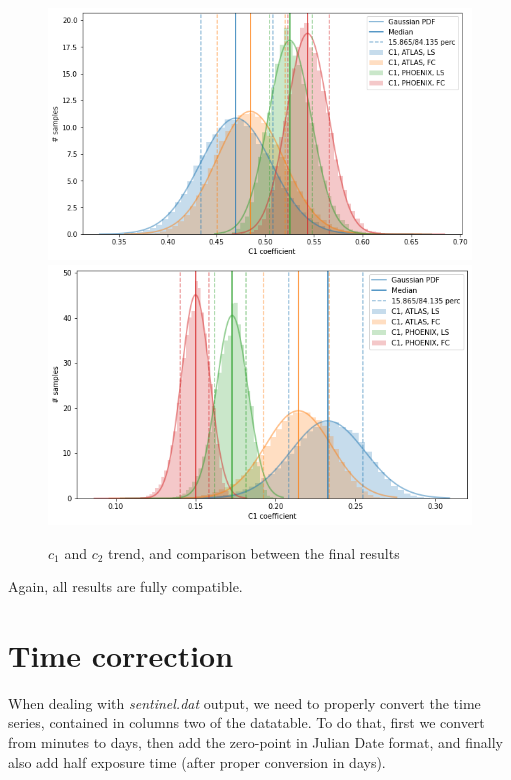 \documentclass[a4paper,11pt,twocolumn]{article}
\begin{document}
\begin{figure}[H]
    \includegraphics[scale=0.35, angle=0]{../pictures/Claret2011/c1_comp.png}
    \includegraphics[scale=0.35, angle=0]{../pictures/Claret2011/c2_comp.png}
    \caption{$c_1$ and $c_2$ trend, and comparison between the final results}
\end{figure}
Again, all results are fully compatible.

\section{Time correction}
\label{sect:app_B}

When dealing with \textit{sentinel.dat} output, we need to properly convert the 
time series, contained in columns two of the datatable. To do that, first we
convert from minutes to days, then add the zero-point in Julian Date format, and 
finally also add half exposure time (after proper conversion in days).
\end{document}
